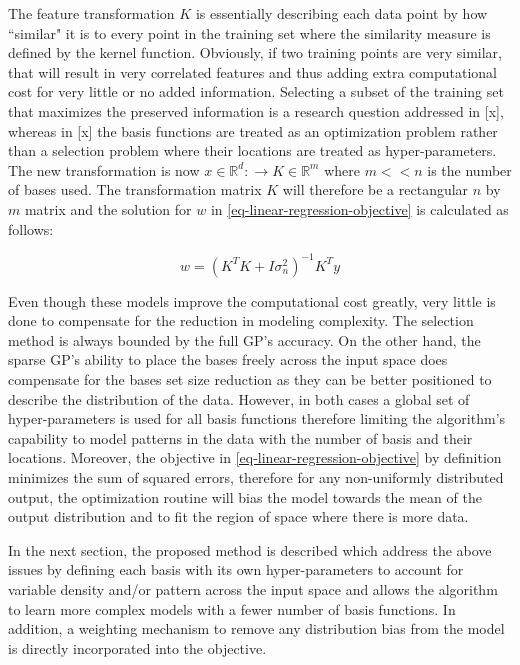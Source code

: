 \documentclass[a4paper,12pt]{article}
\begin{document}
The feature transformation $K$ is essentially describing each data point by how ``similar" it is to every point in the training set where the similarity measure is defined by the kernel function. Obviously, if two training points are very similar, that will result in very correlated features and thus adding extra computational cost for very little or no added information. Selecting a subset of the training set that maximizes the preserved information is a research question addressed in [x], whereas in [x] the basis functions are treated as an optimization problem rather than a selection problem where their locations are treated as hyper-parameters. The new transformation is now $x\in \mathbb{R}^{d}:\rightarrow K\in \mathbb{R}^{m}$ where $m<<n$ is the number of bases used. The transformation matrix $K$ will therefore be a rectangular $n$ by $m$ matrix and the solution for $w$ in \eqref{eq-linear-regression-objective} is calculated as follows:

\begin{equation}
\label{eq-linear-regression-objective-rectangular}
w = \left(K^{T}K+I\sigma_{n}^{2} \right)^{-1}K^{T}y
\end{equation}

Even though these models improve the computational cost greatly, very little is done to compensate for the reduction in modeling complexity. The selection method is always bounded by the full GP's accuracy. On the other hand, the sparse GP's ability to place the bases freely across the input space does compensate for the bases set size reduction as they can be better positioned to describe the distribution of the data. However, in both cases a global set of hyper-parameters is used for all basis functions therefore limiting the algorithm's capability to model patterns in the data with the number of basis and their locations. Moreover, the objective in \eqref{eq-linear-regression-objective} by definition minimizes the sum of squared errors, therefore for any non-uniformly distributed output, the optimization routine will bias the model towards the mean of the output distribution and to fit the region of space where there is more data.

In the next section, the proposed method is described which address the above issues by defining each basis with its own hyper-parameters to account for variable density and/or pattern across the input space and allows the algorithm to learn more complex models with a fewer number of basis functions. In addition, a weighting mechanism to remove any distribution bias from the model is directly incorporated into the objective.
\end{document}

